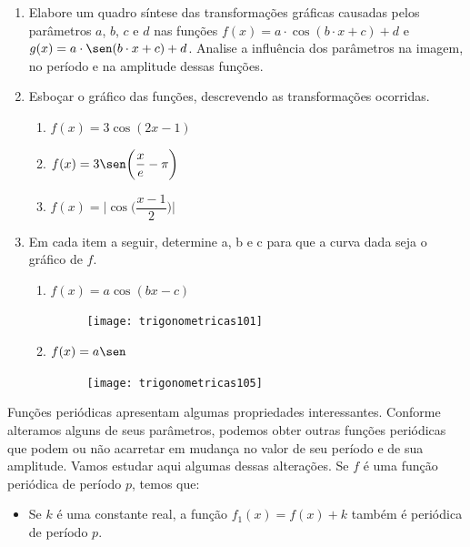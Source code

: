 \begin{enumerate}

\item Elabore um quadro síntese das transformações gráficas causadas pelos parâmetros $a$, $b$, $c$ e $d$ nas funções $f(x)=a\cdot\cos(b\cdot x+c)+d$ e $g(x)=a\cdot\sen(b\cdot x+c)+d$. Analise a influência dos parâmetros na imagem, no período e na amplitude dessas funções.
\item Esboçar o gráfico das funções, descrevendo as transformações ocorridas.
\begin{enumerate}
\item $f(x)=3\cos(2x-1)$
\item $f(x)=3\sen\bigg(\dfrac{x}{e}-\pi\bigg)$
\item $f(x)=\bigg|\cos\bigg(\dfrac{x-1}{2}\bigg)\bigg|$
\end{enumerate}
\item Em cada item a seguir, determine a, b e c para que a curva dada seja o gráfico de $f$.
\begin{enumerate}
\item $f(x)=a\cos(bx-c)$

\begin{figure}[H]
\centering

\texttt{[image: trigonometricas101]}
\end{figure}

\item $f(x)=a\sen$

\begin{figure}[H]
\centering

\texttt{[image: trigonometricas105]}
\end{figure}
\end{enumerate}
\end{enumerate}


Funções periódicas apresentam algumas propriedades interessantes. Conforme alteramos alguns de seus parâmetros, podemos obter outras funções periódicas que podem ou não acarretar em mudança no valor de seu período e de sua amplitude. Vamos estudar aqui algumas dessas alterações. Se $f$ é uma função periódica de período $p$, temos que:

\begin{itemize}
\item Se $k$ é uma constante real, a função $f_1(x) = f(x) + k$ também é periódica de período $p$.
\end{itemize}

